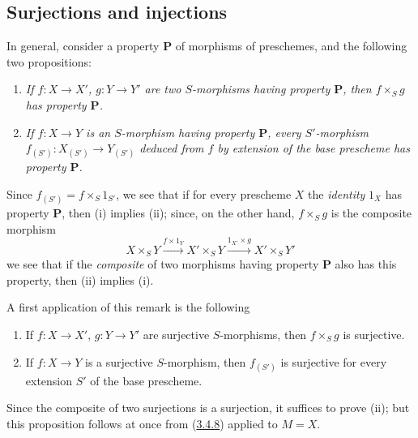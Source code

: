 \subsection{Surjections and injections}
\label{subsection:I.3.5}

\begin{env}[3.5.1]
\label{I.3.5.1}
In general, consider a property $\boldsymbol{P}$ of morphisms of
preschemes, and the following two propositions:
\begin{enumerate}
  \item[(i)] \itshape If $f:X\to X'$, $g:Y\to Y'$ are two $S$-morphisms having
  property $\boldsymbol{P}$, then $f\times_S g$ has property $\boldsymbol{P}$.
  \upshape\item[(ii)] \itshape If $f:X\to Y$ is an $S$-morphism having property
  $\boldsymbol{P}$, every $S'$-morphism $f_{(S')}:X_{(S')}\to Y_{(S')}$ deduced
  from $f$ by extension of the base prescheme has property
  $\boldsymbol{P}$.
\end{enumerate}

Since $f_{(S')}=f\times_S 1_{S'}$, we see that if for every prescheme $X$
the \emph{identity} $1_X$ has property $\boldsymbol{P}$, then (i) implies
(ii); since, on the other hand, $f\times_S g$ is the composite morphism
\label{I.3.5.1.product-composition}
\[
  X\times_S Y\xrightarrow{f\times 1_Y}X'\times_S Y
  \xrightarrow{1_{X'}\times g}X'\times_S Y'
\]
we see that if the \emph{composite} of two morphisms having property
$\boldsymbol{P}$ also has this property, then (ii) implies (i).
\end{env}

A first application of this remark is the following

\begin{proposition}[3.5.2]
\label{I.3.5.2}
\begin{enumerate}
  \item[(i)] If $f:X\to X'$, $g:Y\to Y'$ are surjective $S$-morphisms,
  then $f\times_S g$ is surjective.
  \item[(ii)] If $f:X\to Y$ is a surjective $S$-morphism, then $f_{(S')}$ is
  surjective for every extension $S'$ of the base prescheme.
\end{enumerate}
\end{proposition}

Since the composite of two surjections is a surjection, it suffices to prove
(ii); but this proposition follows at once from
(\hyperref[I.3.4.8]{3.4.8}) applied to $M=X$.

